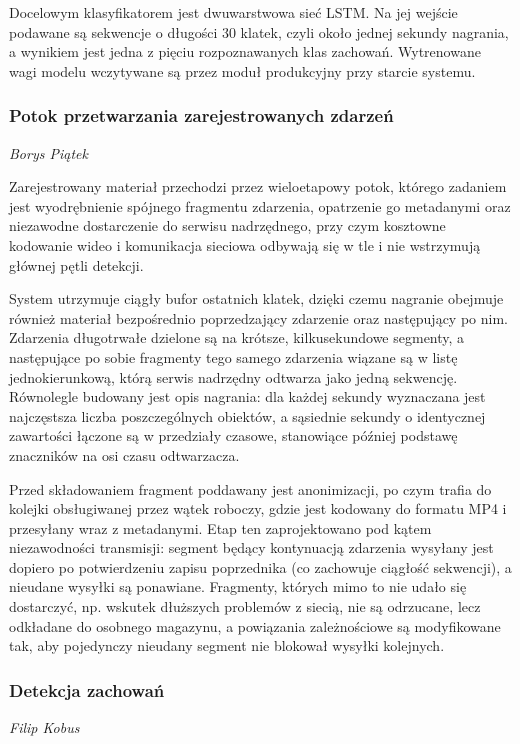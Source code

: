 Docelowym klasyfikatorem jest dwuwarstwowa sieć LSTM. Na jej wejście podawane są sekwencje o długości 30 klatek, czyli około jednej sekundy nagrania, a wynikiem jest jedna z pięciu rozpoznawanych klas zachowań. Wytrenowane wagi modelu wczytywane są przez moduł produkcyjny przy starcie systemu.

\subsubsection{Potok przetwarzania zarejestrowanych zdarzeń}
\small \textit{Borys Piątek}

Zarejestrowany materiał przechodzi przez wieloetapowy potok, którego zadaniem jest wyodrębnienie spójnego fragmentu zdarzenia, opatrzenie go metadanymi oraz niezawodne dostarczenie do serwisu nadrzędnego, przy czym kosztowne kodowanie wideo i komunikacja sieciowa odbywają się w tle i nie wstrzymują głównej pętli detekcji.

System utrzymuje ciągły bufor ostatnich klatek, dzięki czemu nagranie obejmuje również materiał bezpośrednio poprzedzający zdarzenie oraz następujący po nim. Zdarzenia długotrwałe dzielone są na krótsze, kilkusekundowe segmenty, a następujące po sobie fragmenty tego samego zdarzenia wiązane są w listę jednokierunkową, którą serwis nadrzędny odtwarza jako jedną sekwencję. Równolegle budowany jest opis nagrania: dla każdej sekundy wyznaczana jest najczęstsza liczba poszczególnych obiektów, a sąsiednie sekundy o identycznej zawartości łączone są w przedziały czasowe, stanowiące później podstawę znaczników na osi czasu odtwarzacza.

Przed składowaniem fragment poddawany jest anonimizacji, po czym trafia do kolejki obsługiwanej przez wątek roboczy, gdzie jest kodowany do formatu MP4 i przesyłany wraz z metadanymi. Etap ten zaprojektowano pod kątem niezawodności transmisji: segment będący kontynuacją zdarzenia wysyłany jest dopiero po potwierdzeniu zapisu poprzednika (co zachowuje ciągłość sekwencji), a nieudane wysyłki są ponawiane. Fragmenty, których mimo to nie udało się dostarczyć, np. wskutek dłuższych problemów z siecią, nie są odrzucane, lecz odkładane do osobnego magazynu, a powiązania zależnościowe są modyfikowane tak, aby pojedynczy nieudany segment nie blokował wysyłki kolejnych.

\subsubsection{Detekcja zachowań}
\small \textit{Filip Kobus}

